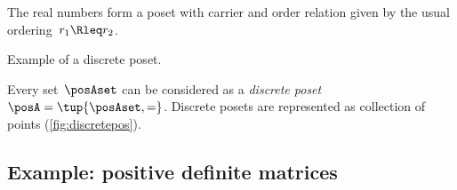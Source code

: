 
\begin{example}[Reals]
	The real numbers \reals form a poset with carrier \reals and order relation given by the usual ordering~$r_1 \Rleq r_2$.
\end{example}

\begin{marginfigure}
	\centering
	\caption{Example of a discrete poset.}
	\label{fig:discretepos}
\end{marginfigure}

\begin{example}
	\label{ex:discreteposet}
	Every set~$\posAset$ can be considered as a \emph{discrete poset}~$\posA = \tup{\posAset,=}$.
	Discrete posets are represented as collection of points (\cref{fig:discretepos}).
\end{example}

\newcommand{\fitinmargin}[1]{%
	\maxsizebox{\marginparwidth}{!}{#1}%
}

\newcommand{\fitinline}[1]{%
	\maxsizebox{\textwidth}{!}{#1}%
}


\subsection{Example: positive definite matrices}

\begin{marginfigure}
	\centering

	\caption{}
	\label{fig:posdef}
\end{marginfigure}

